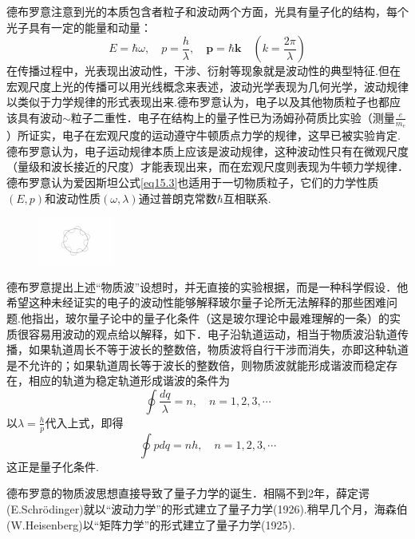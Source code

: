 德布罗意注意到光的本质包含者粒子和波动两个方面，光具有量子化的结构，每个光子具有一定的能量和动量：
\begin{equation}\label{eq15.3}
	E=\hbar\omega,\quad p=\frac{h}{\lambda},\quad \boldsymbol{p}=\hbar\boldsymbol{k}\quad
	(k=\frac{2\pi}{\lambda})
\end{equation}\eqnormal
在传播过程中，光表现出波动性，干涉、衍射等现象就是波动性的典型特征.但在宏观尺度上光的传播可以用光线概念来表述，波动光学表现为几何光学，波动规律以类似于力学规律的形式表现出来.德布罗意认为，电子以及其他物质粒子也都应该具有波动$\sim$粒子二重性．电子在结构上的量子性已为汤姆孙荷质比实验（测量$\frac{e}{m_{e}}$）所证实，电子在宏观尺度的运动遵守牛顿质点力学的规律，这早已被实验肯定.德布罗意认为，电子运动规律本质上应该是波动规律，这种波动性只有在微观尺度（量级和波长接近的尺度）才能表现出来，而在宏观尺度则表现为牛顿力学规律．德布罗意认为爱因斯坦公式\eqref{eq15.3}也适用于一切物质粒子，它们的力学性质$(E,p)$和波动性质$(\omega,\lambda)$通过普朗克常数$\hbar$互相联系.
\begin{figure}
	\centering
	\includegraphics[width=2.5cm,clip]{QM file/figure/1-8}
	\caption{}
	\label{fig.1-8}
\end{figure}

德布罗意提出上述“物质波”设想时，并无直接的实验根据，而是一种科学假设．他希望这种未经证实的电子的波动性能够解释玻尔量子论所无法解释的那些困难问题.他指出，玻尔量子论中的量子化条件（这是玻尔理论中最难理解的一条）的实质很容易用波动的观点给以解释，如下．电子沿轨道运动，相当于物质波沿轨道传播，如果轨道周长不等于波长的整数倍，物质波将自行干涉而消失，亦即这种轨道是不允许的；如果轨道周长等于波长的整数倍，则物质波就能形成谐波而稳定存在，相应的轨道为稳定轨道形成谐波的条件为
\begin{equation}\label{eq15.4}
	\oint\frac{dq}{\lambda}=n,\quad n=1,2,3,\cdots	
\end{equation}
以$\lambda=\frac{h}{p}$代入上式，即得
\begin{equation}\label{eq15.5}
	\oint pdq=nh,\quad n=1,2,3,\cdots
\end{equation}
这正是量子化条件.

德布罗意的物质波思想直接导致了量子力学的诞生．相隔不到2年，薛定谔(E.Schr\"{o}dinger)就以“波动力学”的形式建立了量子力学(1926).稍早几个月，海森伯(W.Heisenberg)以“矩阵力学”的形式建立了量子力学(1925).


